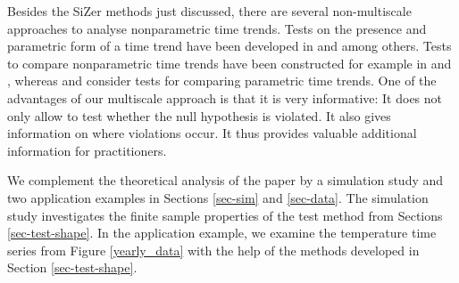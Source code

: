 Besides the SiZer methods just discussed, there are several non-multiscale approaches to analyse nonparametric time trends. Tests on the presence and parametric form of a time trend have been developed in \cite{Dette1999} and \cite{ZhangWu2011} among others. Tests to compare nonparametric time trends have been constructed for example in \cite{DegrasWu2012} and \cite{ChenWu2018}, whereas \cite{Vogelsang2005} and \cite{Lyubchich2016} consider tests for comparing parametric time trends. One of the advantages of our multiscale approach is that it is very informative: It does not only allow to test whether the null hypothesis is violated. It also gives information on where violations occur. 
It thus provides valuable additional information for practitioners. 




We complement the theoretical analysis of the paper by a simulation study and two application examples in Sections \ref{sec-sim} and \ref{sec-data}. The simulation study investigates the finite sample properties of the test method from Sections \ref{sec-test-shape}. In the application example, we examine the temperature time series from Figure \ref{yearly_data} with the help of the methods developed in Section \ref{sec-test-shape}.


